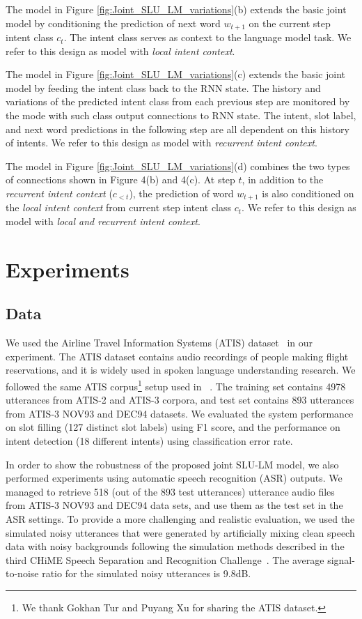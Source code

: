 \documentclass[11pt]{article}
\begin{document}
    The model in Figure \ref{fig:Joint_SLU_LM_variations}(b) extends the basic joint model by conditioning the prediction of next word $w_{t+1}$ on the current step intent class $c_t$. The intent class serves as context to the language model task. We refer to this design as model with \textit{local intent context}.
    
    The model in Figure \ref{fig:Joint_SLU_LM_variations}(c) extends the basic joint model by feeding the intent class back to the RNN state. The history and variations of the predicted intent class from each previous step are monitored by the mode with such class output connections to RNN state. The intent, slot label, and next word predictions in the following step are all dependent on this history of intents. We refer to this design as model with \textit{recurrent intent context}.
    
    The model in Figure \ref{fig:Joint_SLU_LM_variations}(d) combines the two types of connections shown in Figure 4(b) and 4(c). At step $t$, in addition to the \textit{recurrent intent context} ($c_{<t}$), the prediction of word $w_{t+1}$ is also conditioned on the \textit{local intent context} from current step intent class $c_t$. We refer to this design as model with \textit{local and recurrent intent context}.

\section{Experiments}

\subsection{Data}
    We used the Airline Travel Information Systems (ATIS) dataset~\cite{hemphill:90} in our experiment. The ATIS dataset contains audio recordings of people making flight reservations, and it is widely used in spoken language understanding research. We followed the same ATIS corpus\footnote{We thank Gokhan Tur and Puyang Xu for sharing the ATIS dataset.} setup used in ~\cite{mesnil:15,xu:13,tur:10}. The training set contains 4978 utterances from ATIS-2 and ATIS-3 corpora, and test set contains 893 utterances from ATIS-3 NOV93 and DEC94 datasets. We evaluated the system performance on slot filling (127 distinct slot labels) using F1 score, and the performance on intent detection (18 different intents) using classification error rate. 
    
    In order to show the robustness of the proposed joint SLU-LM model, we also performed experiments using automatic speech recognition (ASR) outputs. We managed to retrieve 518 (out of the 893 test utterances) utterance audio files from ATIS-3 NOV93 and DEC94 data sets, and use them as the test set in the ASR settings. To provide a more challenging and realistic evaluation, we used the simulated noisy utterances that were generated by artificially mixing clean speech data with noisy backgrounds following the simulation methods described in the third CHiME Speech Separation and Recognition Challenge~\cite{barker:15}. The average signal-to-noise ratio for the simulated noisy utterances is 9.8dB.
\end{document}
